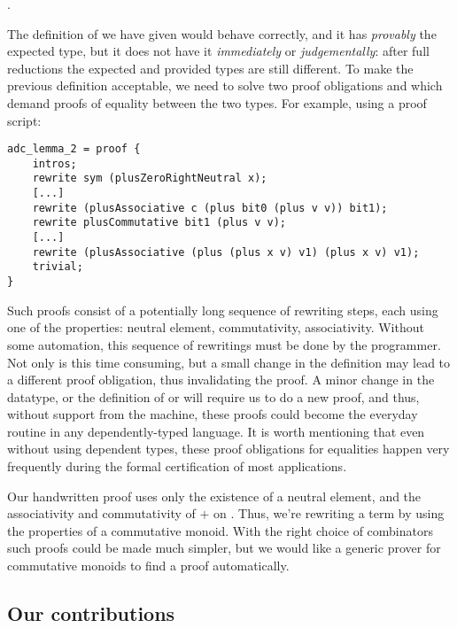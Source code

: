 .

The definition of  we have given would behave correctly, and it has
\emph{provably} the expected type, but it does not have it \emph{immediately}
or \emph{judgementally}: after full reductions the expected and provided types are still
different.
To make the previous
definition acceptable, we need to solve two proof obligations
 and  which demand proofs of equality
between the two types.
For example, using a proof script: 

\begin{lstlisting}
adc_lemma_2 = proof {
    intros;
    rewrite sym (plusZeroRightNeutral x);
    [...]
    rewrite (plusAssociative c (plus bit0 (plus v v)) bit1);
    rewrite plusCommutative bit1 (plus v v);
    [...]
    rewrite (plusAssociative (plus (plus x v) v1) (plus x v) v1);
    trivial;
}
\end{lstlisting}

Such proofs consist of a potentially long sequence of
rewriting steps, each using one of the properties: neutral element,
commutativity, associativity. Without some automation, this sequence of
rewritings must be done by the programmer.  Not only is this time consuming,
but a small change in the definition may lead to a different proof obligation,
thus invalidating the proof. 
A minor change in the datatype, or 
the definition of  or  will require us
to do a new proof, and thus, without support from the machine, these
proofs
could become the everyday routine in any dependently-typed language. It is worth mentioning that even without using dependent types, these proof obligations for equalities happen very frequently during the formal certification of most applications.

Our handwritten proof  uses only the existence of a neutral
element, and the associativity and commutativity of $+$ on . Thus,
we're rewriting a term by using the properties of a commutative monoid. 
With the right choice of combinators~\cite{Carette12} such proofs could be made
much simpler, but we would like a generic prover for commutative monoids to
find a proof automatically.

\subsection{Our contributions}

